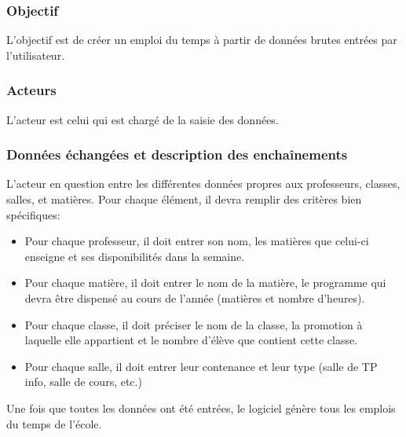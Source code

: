 \documentclass[12pt,a4paper,french]{article}
\begin{document}
\subsubsection{Objectif}
L'objectif est de créer un emploi du temps à partir de données brutes entrées par l'utilisateur.

\subsubsection{Acteurs}
L'acteur est celui qui est chargé de la saisie des données.
        
\subsubsection{Données échangées et description des enchaînements}    
L'acteur en question entre les différentes données propres aux professeurs, classes, salles, et matières. Pour chaque élément, il devra remplir des critères bien spécifiques:

\begin{itemize}
\item Pour chaque professeur, il doit entrer son nom, les matières que celui-ci enseigne et ses disponibilités dans la semaine. 
\item Pour chaque matière, il doit entrer le nom de la matière, le programme qui devra être dispensé au cours de l'année (matières et nombre d'heures).
\item Pour chaque classe, il doit préciser le nom de la classe, la promotion à laquelle elle appartient et le nombre d'élève que contient cette classe.
\item Pour chaque salle, il doit entrer leur contenance et leur type (salle de TP info, salle de cours, etc.)
\end{itemize}
                    
Une fois que toutes les données ont été entrées, le logiciel génère tous les emplois du temps de l'école. 
        
\newpage
\end{document}
